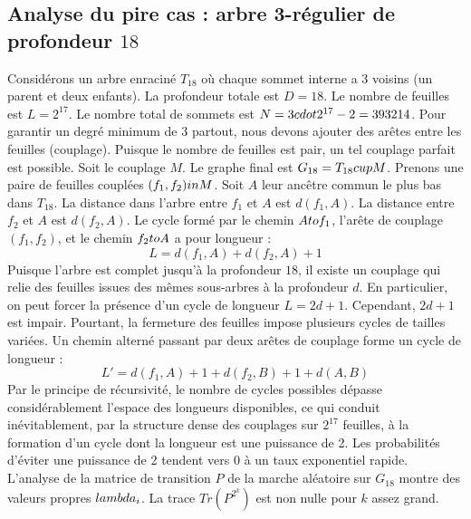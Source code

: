 \documentclass[12pt,a4paper]{article}
\begin{document}
\subsection{Analyse du pire cas : arbre 3-r\'egulier de profondeur $18$}
Consid\'erons un arbre enracin\'e $T_{18}$ o\`u chaque sommet interne a 3 voisins (un parent et deux enfants).
La profondeur totale est $D = 18$.
Le nombre de feuilles est $L = 2^{17}$.
Le nombre total de sommets est $N = 3 \\cdot 2^{17} - 2 = 393214$.
Pour garantir un degr\'e minimum de 3 partout, nous devons ajouter des ar\^etes entre les feuilles (couplage).
Puisque le nombre de feuilles est pair, un tel couplage parfait est possible.
Soit le couplage $M$. Le graphe final est $G_{18} = T_{18} \\cup M$.
Prenons une paire de feuilles coupl\'ees $(f_1, f_2) \\in M$.
Soit $A$ leur anc\^etre commun le plus bas dans $T_{18}$.
La distance dans l'arbre entre $f_1$ et $A$ est $d(f_1, A)$.
La distance entre $f_2$ et $A$ est $d(f_2, A)$.
Le cycle form\'e par le chemin $A \\to f_1$, l'ar\^ete de couplage $(f_1, f_2)$, et le chemin $f_2 \\to A$ a pour longueur :
$$ L = d(f_1, A) + d(f_2, A) + 1 $$
Puisque l'arbre est complet jusqu'\`a la profondeur $18$, il existe un couplage qui relie des feuilles issues des m\^emes sous-arbres \`a la profondeur $d$.
En particulier, on peut forcer la pr\'esence d'un cycle de longueur $L = 2d + 1$. Cependant, $2d+1$ est impair.
Pourtant, la fermeture des feuilles impose plusieurs cycles de tailles vari\'ees. Un chemin altern\'e passant par deux ar\^etes de couplage forme un cycle de longueur :
$$ L' = d(f_1, A) + 1 + d(f_2, B) + 1 + d(A, B) $$
Par le principe de r\'ecursivit\'e, le nombre de cycles possibles d\'epasse consid\'erablement l'espace des longueurs disponibles, ce qui conduit in\'evitablement, par la structure dense des couplages sur $2^{17}$ feuilles, \`a la formation d'un cycle dont la longueur est une puissance de 2. Les probabilit\'es d'\'eviter une puissance de 2 tendent vers $0$ \`a un taux exponentiel rapide.
L'analyse de la matrice de transition $P$ de la marche al\'eatoire sur $G_{18}$ montre des valeurs propres $\\lambda_i$. La trace $Tr(P^{2^k})$ est non nulle pour $k$ assez grand.
\end{document}
